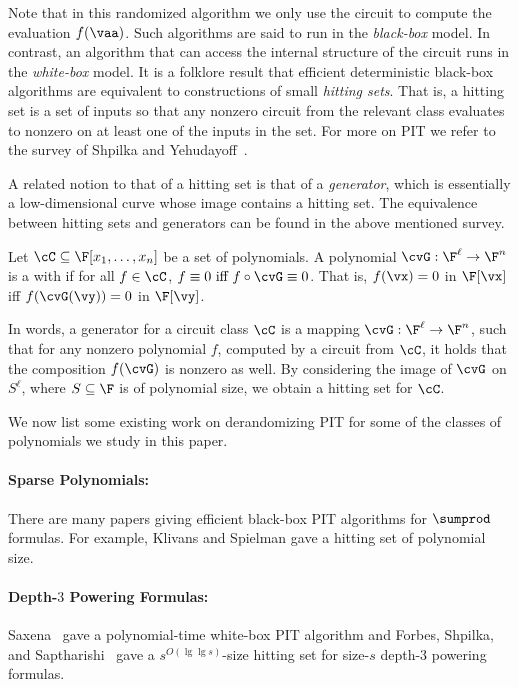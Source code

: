 \documentclass{toc}
\begin{document}
Note that in
this randomized algorithm   %
we only use the circuit to compute the evaluation $f(\vaa)$.  Such algorithms are said to run in the \emph{black-box} model. In contrast, an algorithm that can access the internal structure of the circuit runs in the \emph{white-box} model. It is a folklore result that efficient deterministic black-box algorithms are equivalent to constructions of small \emph{hitting sets}. That is, a hitting set is a set of inputs so that any nonzero circuit from the relevant class evaluates to nonzero on at least one of the inputs in the set. For more on PIT we refer to the survey of Shpilka and Yehudayoff~\cite{SY10}.

A related notion to that of a hitting set is that of a \emph{generator}, which is essentially a low-dimensional curve whose image contains a hitting set.  The equivalence between hitting sets and generators can be found in the above mentioned survey.

\begin{definition}\label{defn:generator}
        Let $\cC\subseteq\F[x_1,\ldots,x_n]$ be a set of polynomials.  A polynomial $\cvG:\F^\ell\to\F^n$ is a  with  if for all $f\in\cC$,
        $f\equiv 0 \text{ iff } f\circ \cvG\equiv 0$. That is, $f(\vx)=0$ in $\F[\vx]$ iff $f(\cvG(\vy))=0$ in $\F[\vy]$.
\end{definition}

In words, a generator for a circuit class $\cC$ is a mapping $\cvG:\F^\ell \to \F^n$, such that for any nonzero polynomial $f$, computed by a circuit from $\cC$, it holds that the composition $f(\cvG)$ is nonzero as well. By considering the image of $\cvG$ on $S^\ell$, where $S \subseteq \F$ is of polynomial size, we obtain a hitting set for $\cC$.

We now list some existing work on derandomizing PIT for some of the classes of polynomials we study in this paper.

\paragraph{Sparse Polynomials:} There are many papers giving efficient black-box PIT algorithms for $\sumprod$ formulas. For example, Klivans and Spielman \cite{KlivansSpielman01} gave a hitting set of polynomial size.

\paragraph{Depth-$3$ Powering Formulas:} Saxena~\cite{Saxena08} gave a
%
polynomial-time   %
white-box PIT algorithm and  Forbes, Shpilka, and Saptharishi~\cite{ForbesSS14} gave a $s^{O(\lg\lg s)}$-size hitting set for size-$s$ depth-$3$ powering formulas.
\end{document}
